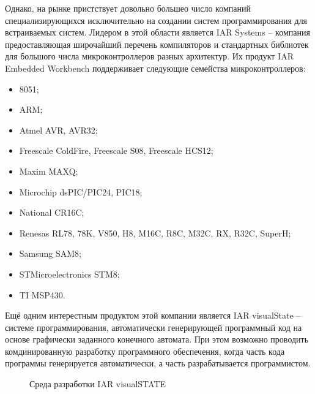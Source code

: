 Однако, на рынке пристствует довольно большео число компаний специализирующихся
исключительно на создании систем программирования для встраиваемых систем. Лидером
в этой области является IAR Systems -- компания предоставляющая широчайший перечень компиляторов и стандартных библиотек для большого числа микроконтроллеров разных архитектур.
Их продукт IAR Embedded Workbench поддерживает следующие семейства микроконтроллеров:
\begin{itemize}
	\item{} 8051;
	\item{} ARM;
	\item{} Atmel AVR, AVR32;
	\item{} Freescale ColdFire, Freescale S08, Freescale HCS12;
	\item{} Maxim MAXQ;
	\item{} Microchip dsPIC/PIC24, PIC18;
	\item{} National CR16C;
	\item{} Renesas RL78, 78K, V850, H8, M16C, R8C, M32C, RX, R32C, SuperH;
	\item{} Samsung SAM8;
	\item{} STMicroelectronics STM8;
	\item{} TI MSP430.
\end{itemize}
Ещё одним интерестным продуктом этой компании является IAR visualState -- системе
программирования, автоматически генерирующей программный код на основе графически
заданного конечного автомата. При этом возможно проводить комдинированную разработку
программного обеспечения, когда часть кода программы генерируется автоматически, а часть
разрабатывается программистом.

\begin{figure}[ht]
	\caption{Среда разработки IAR visualSTATE}
	\label{img:iarVis}
\end{figure}

\newpage{}

